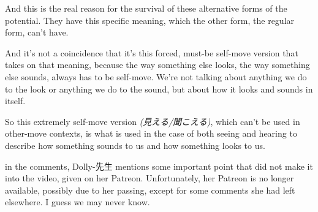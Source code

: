 And this is the real reason for the survival of these alternative forms of the potential. They have this specific meaning, which the other form, the regular form, can't have.

And it's not a coincidence that it's this forced, must-be self-move version that takes on that meaning, because the way something else looks, the way something else sounds, always has to be self-move. We're not talking about anything we do to the look or anything we do to the sound, but about how it looks and sounds in itself.

So this extremely self-move version {\em (見える/聞こえる)}, which can't be used in other-move contexts, is what is used in the case of both seeing and hearing to describe how something sounds to us and how something looks to us.

in the comments, Dolly-先生 mentions some important point that did not make it into the video, given on her Patreon. Unfortunately, her Patreon is no longer available, possibly due to her passing, except for some comments she had left elsewhere. I guess we may never know.

\stopsectionlevel

\stopsectionlevel
